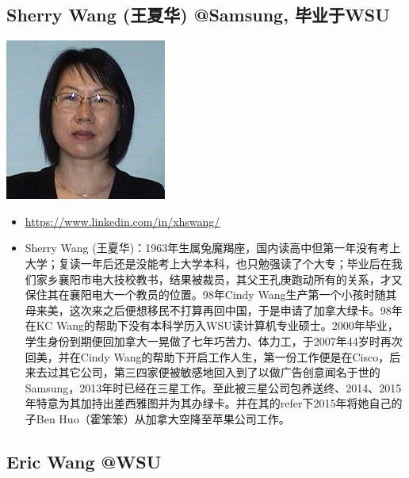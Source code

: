 \documentclass[9pt, b5paper]{article}
\begin{document}
\subsection{Sherry Wang (王夏华) @Samsung, 毕业于WSU}
\label{sec-3-2}

\includegraphics[width=.9\linewidth]{./pic/Sherry Wang.jpg}
\begin{itemize}
\item \url{https://www.linkedin.com/in/xhswang/}
\item Sherry Wang (王夏华)：1963年生属兔魔羯座，国内读高中但第一年没有考上大学；复读一年后还是没能考上大学本科，也只勉强读了个大专；毕业后在我们家乡襄阳市电大技校教书，结果被裁员，其父王孔庚跑动所有的关系，才又保住其在襄阳电大一个教员的位置。98年Cindy Wang生产第一个小孩时随其母来美，这次来之后便想移民不打算再回中国，于是申请了加拿大绿卡。98年在KC Wang的帮助下没有本科学历入WSU读计算机专业硕士。2000年毕业，学生身份到期便回加拿大一晃做了七年巧苦力、体力工，于2007年44岁时再次回美，并在Cindy Wang的帮助下开启工作人生，第一份工作便是在Cisco，后来去过其它公司，第三四家便被敏感地回入到了以做广告创意闻名于世的Samsung，2013年时已经在三星工作。至此被三星公司包养送终、2014、2015年特意为其加持出差西雅图并为其办绿卡。并在其的refer下2015年将她自己的子Ben Huo（霍笨笨）从加拿大空降至苹果公司工作。
\end{itemize}
\subsection{Eric Wang @WSU}
\label{sec-3-3}
\end{document}
